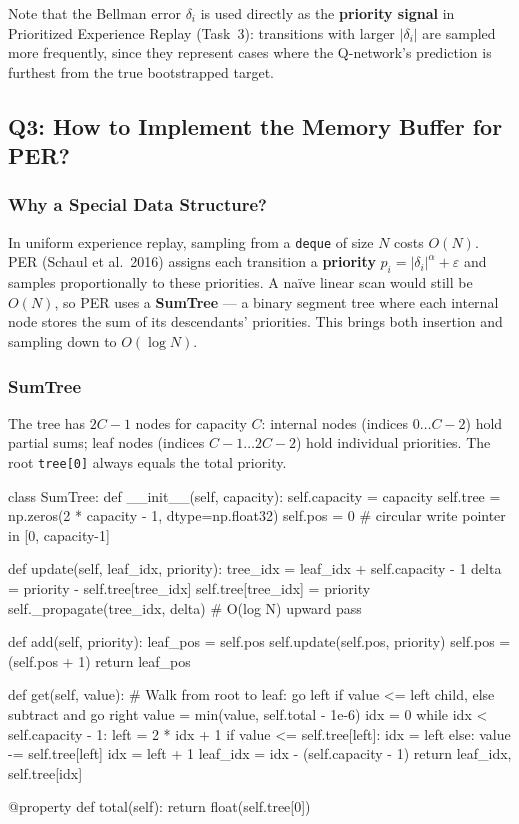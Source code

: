 \documentclass[12pt,a4paper]{report}
\begin{document}
Note that the Bellman error $\delta_i$ is used directly as the \textbf{priority signal}
in Prioritized Experience Replay (Task~3): transitions with larger $|\delta_i|$ are sampled
more frequently, since they represent cases where the Q-network's prediction is furthest
from the true bootstrapped target.

\subsection*{Q3: How to Implement the Memory Buffer for PER?}

\subsubsection*{Why a Special Data Structure?}

In uniform experience replay, sampling from a \texttt{deque} of size $N$ costs $O(N)$.
PER (Schaul et al.\ 2016) assigns each transition a \textbf{priority}
$p_i = |\delta_i|^\alpha + \varepsilon$ and samples proportionally to these priorities.
A naïve linear scan would still be $O(N)$, so PER uses a \textbf{SumTree} --- a binary
segment tree where each internal node stores the sum of its descendants' priorities.
This brings both insertion and sampling down to $O(\log N)$.

\subsubsection*{SumTree}

The tree has $2C - 1$ nodes for capacity $C$:
internal nodes (indices $0 \ldots C-2$) hold partial sums;
leaf nodes (indices $C-1 \ldots 2C-2$) hold individual priorities.
The root \texttt{tree[0]} always equals the total priority.

\begin{pycode}
class SumTree:
    def __init__(self, capacity):
        self.capacity = capacity
        self.tree = np.zeros(2 * capacity - 1, dtype=np.float32)
        self.pos  = 0   # circular write pointer in [0, capacity-1]

    def update(self, leaf_idx, priority):
        tree_idx = leaf_idx + self.capacity - 1
        delta = priority - self.tree[tree_idx]
        self.tree[tree_idx] = priority
        self._propagate(tree_idx, delta)  # O(log N) upward pass

    def add(self, priority):
        leaf_pos = self.pos
        self.update(self.pos, priority)
        self.pos = (self.pos + 1) %
        return leaf_pos

    def get(self, value):
        # Walk from root to leaf: go left if value <= left child, else subtract and go right
        value = min(value, self.total - 1e-6)
        idx = 0
        while idx < self.capacity - 1:
            left = 2 * idx + 1
            if value <= self.tree[left]:
                idx = left
            else:
                value -= self.tree[left]
                idx = left + 1
        leaf_idx = idx - (self.capacity - 1)
        return leaf_idx, self.tree[idx]

    @property
    def total(self):
        return float(self.tree[0])
\end{pycode}
\end{document}
